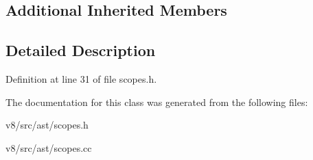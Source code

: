\subsection*{Additional Inherited Members}


\subsection{Detailed Description}


Definition at line 31 of file scopes.\+h.



The documentation for this class was generated from the following files\+:\begin{DoxyCompactItemize}
\item 
v8/src/ast/scopes.\+h\item 
v8/src/ast/scopes.\+cc\end{DoxyCompactItemize}
